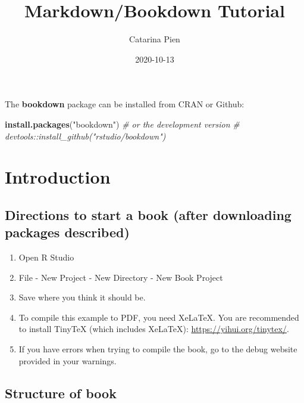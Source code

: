 \documentclass[
]{book}
\title{Markdown/Bookdown Tutorial}
\author{Catarina Pien}
\date{2020-10-13}
\newenvironment{Shaded}{\begin{snugshade}}{\end{snugshade}}
\newcommand{\CommentTok}[1]{\textcolor[rgb]{0.56,0.35,0.01}{\textit{#1}}}
\newcommand{\KeywordTok}[1]{\textcolor[rgb]{0.13,0.29,0.53}{\textbf{#1}}}
\newcommand{\NormalTok}[1]{#1}
\newcommand{\StringTok}[1]{\textcolor[rgb]{0.31,0.60,0.02}{#1}}
\providecommand{\tightlist}{%
  \setlength{\itemsep}{0pt}\setlength{\parskip}{0pt}}
\begin{document}
\maketitle

{
\setcounter{tocdepth}{1}
\tableofcontents
}
The \textbf{bookdown} package can be installed from CRAN or Github:

\begin{Shaded}
\begin{Highlighting}[]
\KeywordTok{install.packages}\NormalTok{(}\StringTok{"bookdown"}\NormalTok{)}
\CommentTok{\# or the development version}
\CommentTok{\# devtools::install\_github("rstudio/bookdown")}
\end{Highlighting}
\end{Shaded}

\hypertarget{intro}{%
\chapter{Introduction}\label{intro}}

\hypertarget{directions-to-start-a-book-after-downloading-packages-described}{%
\section{Directions to start a book (after downloading packages described)}\label{directions-to-start-a-book-after-downloading-packages-described}}

\begin{enumerate}
\def\labelenumi{\arabic{enumi}.}
\tightlist
\item
  Open R Studio
\item
  File - New Project - New Directory - New Book Project
\item
  Save where you think it should be.
\item
  To compile this example to PDF, you need XeLaTeX. You are recommended to install TinyTeX (which includes XeLaTeX): \url{https://yihui.org/tinytex/}.
\item
  If you have errors when trying to compile the book, go to the debug website provided in your warnings.
\end{enumerate}

\hypertarget{structure-of-book}{%
\section{Structure of book}\label{structure-of-book}}
\end{document}
